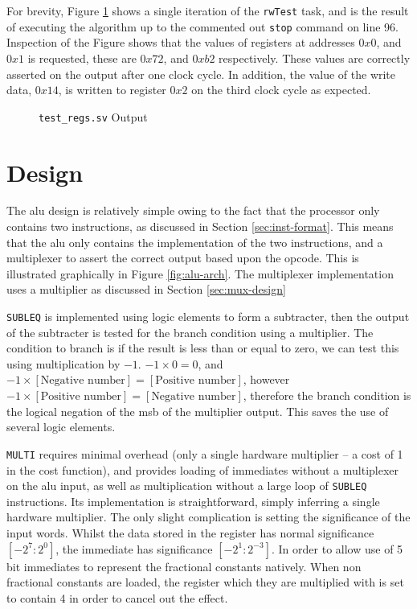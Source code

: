 For brevity, Figure \ref{fig:test-regs} shows a single iteration of the \texttt{rwTest} task, and is the result of executing the algorithm up to the commented out \texttt{stop} command on line 96. Inspection of the Figure shows that the values of registers at addresses $0x0$, and $0x1$ is requested, these are $0x72$, and $0xb2$ respectively. These values are correctly asserted on the output after one clock cycle. In addition, the value of the write data, $0x14$, is written to register $0x2$ on the third clock cycle as expected.



\begin{figure}[ht]
	\centering
	
	\caption{\texttt{test\_regs.sv} Output}
	\label{fig:test-regs}
\end{figure}

\section{ Design} \label{sec:alu-design}

The \gls{alu} design is relatively simple owing to the fact that the processor only contains two instructions, as discussed in Section \ref{sec:inst-format}. This means that the \gls{alu} only contains the implementation of the two instructions, and a multiplexer to assert the correct output based upon the opcode. This is illustrated graphically in Figure \ref{fig:alu-arch}. The multiplexer implementation uses a multiplier as discussed in Section \ref{sec:mux-design}

\texttt{SUBLEQ} is implemented using logic elements to form a subtracter, then the output of the subtracter is tested for the branch condition using a multiplier. The condition to branch is if the result is less than or equal to zero, we can test this using multiplication by $-1$. $-1 \times 0 = 0$, and $-1 \times [\text{Negative number}] = [\text{Positive number}]$, however $-1 \times [\text{Positive number}] = [\text{Negative number}]$, therefore the branch condition is the logical negation of the \gls{msb} of the multiplier output. This saves the use of several logic elements.

\texttt{MULTI} requires minimal overhead (only a single hardware multiplier -- a cost of 1 in the cost function), and provides loading of immediates without a multiplexer on the \gls{alu} input, as well as multiplication without a large loop of \texttt{SUBLEQ} instructions. Its implementation is straightforward, simply inferring a single hardware multiplier. The only slight complication is setting the significance of the input words. Whilst the data stored in the register has normal significance $[-2^7: 2^0]$, the immediate has significance $[-2^1: 2^{-3}]$. In order to allow use of 5 bit immediates to represent the fractional constants natively. When non fractional constants are loaded, the register which they are multiplied with is set to contain 4 in order to cancel out the effect.

